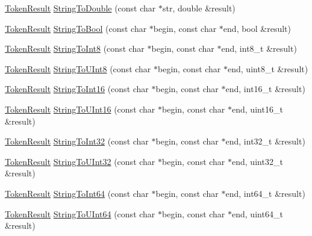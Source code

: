\begin{DoxyCompactItemize}
\item 
\hyperlink{namespacemage_a2178ba2411db5912f41b2e7698c2037d}{Token\+Result} \hyperlink{namespacemage_a49403be4dcbd136ffb13f62669576c50}{String\+To\+Double} (const char $\ast$str, double \&result)
\item 
\hyperlink{namespacemage_a2178ba2411db5912f41b2e7698c2037d}{Token\+Result} \hyperlink{namespacemage_a5deef7799d080b8c98c9ead54fbcb6db}{String\+To\+Bool} (const char $\ast$begin, const char $\ast$end, bool \&result)
\item 
\hyperlink{namespacemage_a2178ba2411db5912f41b2e7698c2037d}{Token\+Result} \hyperlink{namespacemage_a0bd81bf259563dd9de793ada42405c95}{String\+To\+Int8} (const char $\ast$begin, const char $\ast$end, int8\+\_\+t \&result)
\item 
\hyperlink{namespacemage_a2178ba2411db5912f41b2e7698c2037d}{Token\+Result} \hyperlink{namespacemage_ae6af1c0b282e0858fe4376325b4d06c6}{String\+To\+U\+Int8} (const char $\ast$begin, const char $\ast$end, uint8\+\_\+t \&result)
\item 
\hyperlink{namespacemage_a2178ba2411db5912f41b2e7698c2037d}{Token\+Result} \hyperlink{namespacemage_aa993ba23b5023902c29ecbe9b0d7a954}{String\+To\+Int16} (const char $\ast$begin, const char $\ast$end, int16\+\_\+t \&result)
\item 
\hyperlink{namespacemage_a2178ba2411db5912f41b2e7698c2037d}{Token\+Result} \hyperlink{namespacemage_a12bd34f17d7d39ac8d054be9293efe54}{String\+To\+U\+Int16} (const char $\ast$begin, const char $\ast$end, uint16\+\_\+t \&result)
\item 
\hyperlink{namespacemage_a2178ba2411db5912f41b2e7698c2037d}{Token\+Result} \hyperlink{namespacemage_a011b7977a7ae88795aac61e0e921bffe}{String\+To\+Int32} (const char $\ast$begin, const char $\ast$end, int32\+\_\+t \&result)
\item 
\hyperlink{namespacemage_a2178ba2411db5912f41b2e7698c2037d}{Token\+Result} \hyperlink{namespacemage_ad84d36f8aaa4376d26b79a2fbd8fe22a}{String\+To\+U\+Int32} (const char $\ast$begin, const char $\ast$end, uint32\+\_\+t \&result)
\item 
\hyperlink{namespacemage_a2178ba2411db5912f41b2e7698c2037d}{Token\+Result} \hyperlink{namespacemage_a1e044f5c734c6597945b775100c45086}{String\+To\+Int64} (const char $\ast$begin, const char $\ast$end, int64\+\_\+t \&result)
\item 
\hyperlink{namespacemage_a2178ba2411db5912f41b2e7698c2037d}{Token\+Result} \hyperlink{namespacemage_a8e3b6a19a6ab9e7c905150352b8ab0ea}{String\+To\+U\+Int64} (const char $\ast$begin, const char $\ast$end, uint64\+\_\+t \&result)

\end{DoxyCompactItemize}
